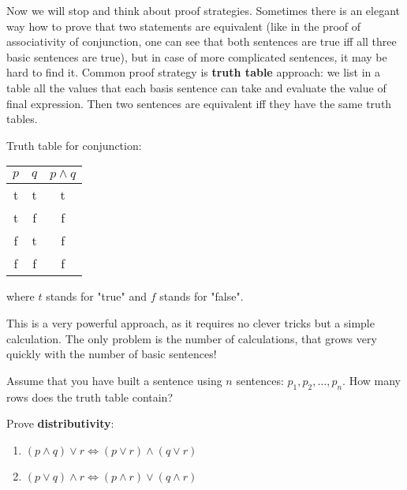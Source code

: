 Now we will stop and think about proof strategies. Sometimes there is an elegant way how to prove that two statements are equivalent (like in the proof of associativity of
conjunction, one can see that both sentences are true iff all three basic sentences are true), but in case of more complicated sentences, it may be hard to find it. Common
proof strategy is \textbf{truth table} approach: we list in a table all the values that each basis sentence can take and evaluate the value of final expression.
Then two sentences are equivalent iff they have the same truth tables.

\begin{example}
  Truth table for conjunction:\\
  \begin{center}
    \begin{tabular}{ c  c  c }
      $p$ & $q$ & $p\wedge q$ \\
      \hline
      t  &  t &        t     \\
      t  &  f &        f     \\
      f  &  t &        f     \\
      f  &  f &        f     \\
    \end{tabular}
  \end{center}
  where $t$ stands for "true" and $f$ stands for "false".
\end{example}

This is a very powerful approach, as it requires no clever tricks but a simple calculation. The only problem is the number of calculations, that grows very quickly with
the number of basic sentences!

\begin{exercise}
  Assume that you have built a sentence using $n$ sentences: $p_1, p_2, \dots, p_n$. How many rows does the truth table contain?
\end{exercise}

\begin{exercise}
  Prove \textbf{distributivity}:
  \begin{enumerate}
    \item $(p\wedge q)\vee r \Leftrightarrow (p\vee r) \wedge (q\vee r)$
    \item $(p\vee q)\wedge r \Leftrightarrow (p\wedge r) \vee (q\wedge r)$
  \end{enumerate}
\end{exercise}

